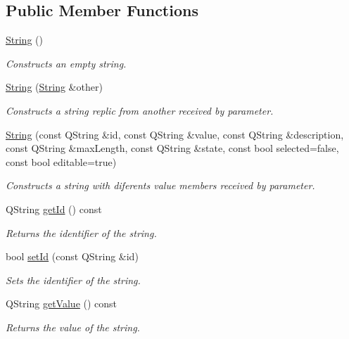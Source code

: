 \subsection*{Public Member Functions}
\begin{DoxyCompactItemize}
\item 
\mbox{\label{classString_a8a7ef356e05eb9b1ea1ab518baee3095}} 
\mbox{\hyperlink{classString_a8a7ef356e05eb9b1ea1ab518baee3095}{String}} ()
\begin{DoxyCompactList}\small\item\em Constructs an empty string. \end{DoxyCompactList}\item 
\mbox{\hyperlink{classString_addd6bcc4ba529bdc45d3fd69ad1a3569}{String}} (\mbox{\hyperlink{classString}{String}} \&other)
\begin{DoxyCompactList}\small\item\em Constructs a string replic from another received by parameter. \end{DoxyCompactList}\item 
\mbox{\hyperlink{classString_a4edf46375241ec3585f26758750b3d9e}{String}} (const Q\+String \&id, const Q\+String \&value, const Q\+String \&description, const Q\+String \&max\+Length, const Q\+String \&state, const bool selected=false, const bool editable=true)
\begin{DoxyCompactList}\small\item\em Constructs a string with diferents value members received by parameter. \end{DoxyCompactList}\item 
Q\+String \mbox{\hyperlink{classString_ab32615121278a445dba468c7ef18ee7a}{get\+Id}} () const
\begin{DoxyCompactList}\small\item\em Returns the identifier of the string. \end{DoxyCompactList}\item 
bool \mbox{\hyperlink{classString_a11c7a52caa2ebc68d27ecd9cb5a35d16}{set\+Id}} (const Q\+String \&id)
\begin{DoxyCompactList}\small\item\em Sets the identifier of the string. \end{DoxyCompactList}\item 
Q\+String \mbox{\hyperlink{classString_a926f7c30cfca26009604d0c765950c4b}{get\+Value}} () const
\begin{DoxyCompactList}\small\item\em Returns the value of the string. \end{DoxyCompactList}\item 

\end{DoxyCompactItemize}
